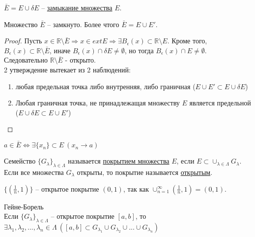 \begin{definition}
    $\bar{E} = E \cup \delta E$ -- \underline{замыкание множества} $E$.
\end{definition}

\begin{lemma}
    Множество $\bar{E}$ -- замкнуто. Более чтого $\bar{E} = E \cup E'$.
\end{lemma}

\begin{proof}
    Пусть $x \in \mathds{R} \setminus \bar{E} \Rightarrow x \in extE \Rightarrow \exists B_{\epsilon}(x) \subset \mathds{R} \setminus E$.
    Кроме того, $B_{\epsilon}(x) \subset \mathds{R} \setminus \bar{E}$, иначе $B_{\epsilon}(x) \cap \delta E \neq \emptyset$, но тогда $B_{\epsilon}(x) \cap E \neq \emptyset$.
    Следовательно $\mathds{R} \setminus \bar{E}$ - открыто.\\
    2 утверждение вытекает из 2 наблюдений:
    \begin{enumerate}
        \item любая предельная точка либо внутренняя, либо граничная ($E \cup E' \subset E \cup \delta E$)
        \item Любая граничная точка, не принадлежащая множеству $E$ является предельной ($E \cup \delta E \subset E \cup E'$)
    \end{enumerate}
\end{proof}

\begin{problem}
    $a \in \bar{E} \iff \exists\{x_{n}\} \subset E \ (x_{n} \to a)$
\end{problem}

\begin{definition}
    Семейство $\{G_{\lambda}\}_{\lambda \in \Lambda}$ называется \underline{покрытием множества} $E$, если $E \subset \cup_{\lambda \in \Lambda} G_{\lambda}$. Если все множества $G_{\lambda}$ открыты, то покрытие называется \underline{открытым}.
\end{definition}

\begin{example}
    $\{(\frac{1}{n}, 1)\}$ -- открытое покрытие $(0, 1)$, так как $\cup_{n = 1}^{\infty}(\frac{1}{n}, 1) = (0, 1)$.
\end{example}

\begin{theorem} Гейне-Борель\\
    Если $\{G_{\lambda}\}_{\lambda \in \Lambda}$ -- открытое покрытие $[a, b]$, то $\exists\lambda_1, \lambda_2, ..., \lambda_n \in \Lambda \  ([a, b] \subset G_{\lambda_1} \cup G_{\lambda_2} \cup ... \cup G_{\lambda_n})$
\end{theorem}

